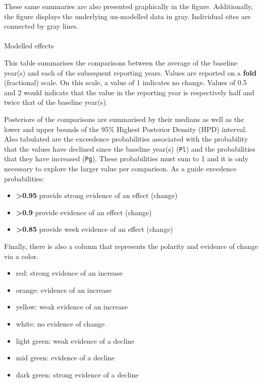 \documentclass[
  8pt,
  a4paper]{article}
\makeatletter
\let\oldparagraph\paragraph
\renewcommand{\paragraph}{
    \@ifstar
      \xxxParagraphStar
      \xxxParagraphNoStar
  }
\newcommand{\xxxParagraphStar}[1]{\oldparagraph*{#1}\mbox{}}
\newcommand{\xxxParagraphNoStar}[1]{\oldparagraph{#1}\mbox{}}
\providecommand{\tightlist}{%
  \setlength{\itemsep}{0pt}\setlength{\parskip}{0pt}}
\makeatother
\begin{document}
These same summaries are also presented graphically in the figure.
Additionally, the figure displays the underlying un-modelled data in
gray. Individual sites are connected by gray lines.

\paragraph{Modelled effects}\label{modelled-effects}

This table summarises the comparisons between the average of the
baseline year(s) and each of the subsequent reporting years. Values are
reported on a \textbf{fold} (fractional) scale. On this scale, a value
of 1 indicates no change. Values of 0.5 and 2 would indicate that the
value in the reporting year is respectively half and twice that of the
baseline year(s).

Posteriors of the comparisons are summarised by their medians as well as
the lower and upper bounds of the 95\% Highest Posterior Density (HPD)
interval. Also tabulated are the exceedence probabilities associated
with the probability that the values have declined since the baseline
year(s) (\texttt{Pl}) and the probabilities that they have increased
(\texttt{Pg}). These probabilities must sum to 1 and it is only
necessary to explore the larger value per comparison. As a guide
exeedence probabilities:

\begin{itemize}
\tightlist
\item
  \textbf{\textgreater0.95} provide strong evidence of an effect
  (change)
\item
  \textbf{\textgreater0.9} provide evidence of an effect (change)
\item
  \textbf{\textgreater0.85} provide week evidence of an effect (change)
\end{itemize}

Finally, there is also a column that represents the polarity and
evidence of change via a color.

\begin{itemize}
\tightlist
\item
  red: strong evidence of an increase
\item
  orange: evidence of an increase
\item
  yellow: weak evidence of an increase
\item
  white: no evidence of change
\item
  light green: weak evidence of a decline
\item
  mid green: evidence of a decline
\item
  dark green: strong evidence of a decline
\end{itemize}
\end{document}
